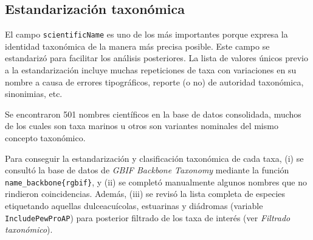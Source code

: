 \documentclass[sn-apa,pdflatex]{sn-jnl}
\begin{document}
\subsection{Estandarización
taxonómica}\label{estandarizaciuxf3n-taxonuxf3mica}

El campo \texttt{scientificName} es uno de los más importantes porque
expresa la identidad taxonómica de la manera más precisa posible. Este
campo se estandarizó para facilitar los análisis posteriores. La lista
de valores únicos previo a la estandarización incluye muchas
repeticiones de taxa con variaciones en su nombre a causa de errores
tipográficos, reporte (o no) de autoridad taxonómica, sinonimias, etc.

Se encontraron 501 nombres científicos en la base de datos consolidada,
muchos de los cuales son taxa marinos u otros son variantes nominales
del mismo concepto taxonómico.

Para conseguir la estandarización y clasificación taxonómica de cada
taxa, (i) se consultó la base de datos de \emph{GBIF Backbone Taxonomy}
mediante la función \texttt{name\_backbone\{rgbif\}}, y (ii) se completó
manualmente algunos nombres que no rindieron coincidencias. Además,
(iii) se revisó la lista completa de especies etiquetando aquellas
dulceacuícolas, estuarinas y diádromas (variable
\texttt{IncludePewProAP}) para posterior filtrado de los taxa de interés
(ver \emph{Filtrado taxonómico}).
\end{document}
